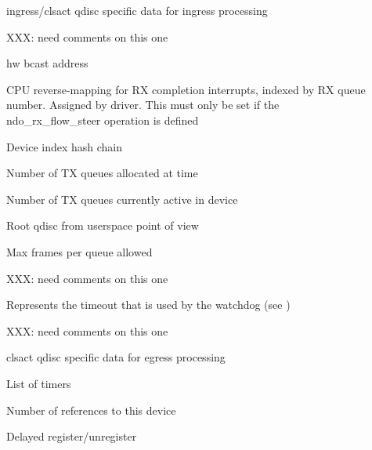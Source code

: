 \documentclass[a4paper,8pt,english]{sphinxmanual}
\begin{document}
\begin{description}
\item[{}] \leavevmode
ingress/clsact qdisc specific data for
ingress processing

\item[{}] \leavevmode
XXX: need comments on this one

\item[{}] \leavevmode
hw bcast address

\item[{}] \leavevmode
CPU reverse-mapping for RX completion interrupts,
indexed by RX queue number. Assigned by driver.
This must only be set if the ndo\_rx\_flow\_steer
operation is defined

\item[{}] \leavevmode
Device index hash chain

\item[{}] \leavevmode
Number of TX queues allocated at  time

\item[{}] \leavevmode
Number of TX queues currently active in device

\item[{}] \leavevmode
Root qdisc from userspace point of view

\item[{}] \leavevmode
Max frames per queue allowed

\item[{}] \leavevmode
XXX: need comments on this one

\item[{}] \leavevmode
Represents the timeout that is used by
the watchdog (see )

\item[{}] \leavevmode
XXX: need comments on this one

\item[{}] \leavevmode
clsact qdisc specific data for
egress processing

\item[{}] \leavevmode
List of timers

\item[{}] \leavevmode
Number of references to this device

\item[{}] \leavevmode
Delayed register/unregister


\end{description}
\end{document}
